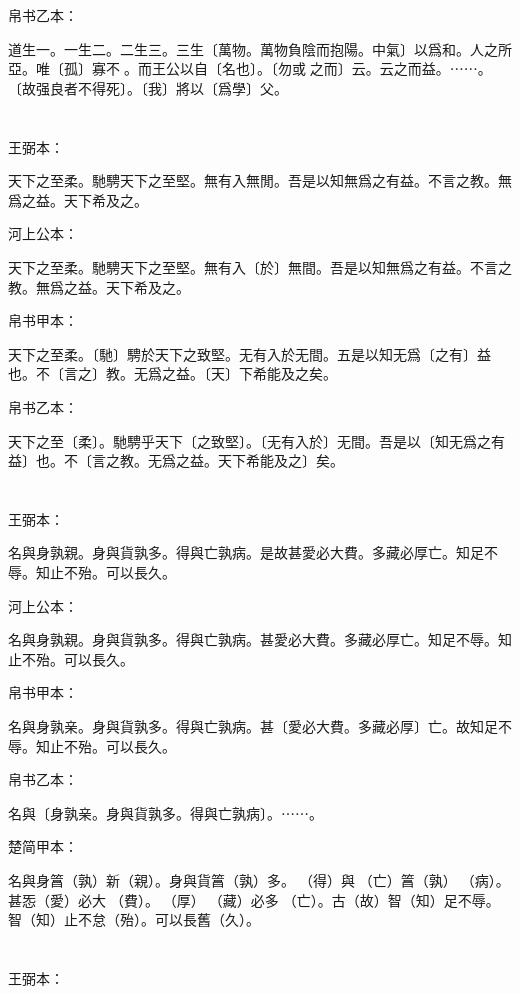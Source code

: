 \documentclass[a5paper]{ctexbook}
\begin{document}
    帛书乙本：

    道生一。一生二。二生三。三生〔萬物。萬物負陰而抱陽。中氣〕以爲和。人之所亞。唯〔孤〕寡不𥞤。而王公以自〔名也〕。〔勿或𢿃之而〕云。云之而益。⋯⋯。〔故强良者不得死〕。〔我〕將以〔爲學〕父。

    \chapter{}
    王弼本：

    天下之至柔。馳騁天下之至堅。無有入無閒。吾是以知無爲之有益。不言之教。無爲之益。天下希及之。

    河上公本：

    天下之至柔。馳騁天下之至堅。無有入〔於〕無間。吾是以知無爲之有益。不言之教。無爲之益。天下希及之。

    帛书甲本：

    天下之至柔。〔馳〕騁於天下之致堅。无有入於无間。五是以知无爲〔之有〕益也。不〔言之〕教。无爲之益。〔天〕下希能及之矣。

    帛书乙本：

    天下之至〔柔〕。馳騁乎天下〔之致堅〕。〔无有入於〕无間。吾是以〔知无爲之有益〕也。不〔言之教。无爲之益。天下希能及之〕矣。

    \chapter{}
    王弼本：

    名與身孰親。身與貨孰多。得與亡孰病。是故甚愛必大費。多藏必厚亡。知足不辱。知止不殆。可以長久。

    河上公本：

    名與身孰親。身與貨孰多。得與亡孰病。甚愛必大費。多藏必厚亡。知足不辱。知止不殆。可以長久。

    帛书甲本：

    名與身孰亲。身與貨孰多。得與亡孰病。甚〔愛必大費。多藏必厚〕亡。故知足不辱。知止不殆。可以長久。

    帛书乙本：

    名與〔身孰亲。身與貨孰多。得與亡孰病〕。⋯⋯。

    楚简甲本：

    名與身䈞（孰）新（親）。身與貨䈞（孰）多。󰴼（得）與󶵔（亡）䈞（孰）󶓄（病）。甚㤅（愛）必大󶵖（費）。󶵗（厚）󶤖（藏）必多󶵔（亡）。古（故）智（知）足不辱。智（知）止不怠（殆）。可以長舊（久）。

    \chapter{}
    王弼本：
\end{document}
